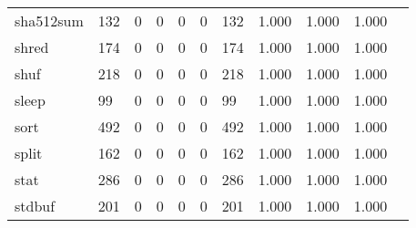 \begin{longtable}{lp{1.10cm}p{1.10cm}p{1.10cm}p{1.10cm}p{1.10cm}p{1.10cm}p{1.10cm}p{1.10cm}p{1.10cm}p{1.10cm}}
sha512sum &                    132 &                                  0 &                                 0 &                                0 &                                 0 &                             132 &                          1.000 &                                 1.000 &                               1.000 \\
shred     &                    174 &                                  0 &                                 0 &                                0 &                                 0 &                             174 &                          1.000 &                                 1.000 &                               1.000 \\
shuf      &                    218 &                                  0 &                                 0 &                                0 &                                 0 &                             218 &                          1.000 &                                 1.000 &                               1.000 \\
sleep     &                     99 &                                  0 &                                 0 &                                0 &                                 0 &                              99 &                          1.000 &                                 1.000 &                               1.000 \\
sort      &                    492 &                                  0 &                                 0 &                                0 &                                 0 &                             492 &                          1.000 &                                 1.000 &                               1.000 \\
split     &                    162 &                                  0 &                                 0 &                                0 &                                 0 &                             162 &                          1.000 &                                 1.000 &                               1.000 \\
stat      &                    286 &                                  0 &                                 0 &                                0 &                                 0 &                             286 &                          1.000 &                                 1.000 &                               1.000 \\
stdbuf    &                    201 &                                  0 &                                 0 &                                0 &                                 0 &                             201 &                          1.000 &                                 1.000 &                               1.000 \\

\end{longtable}
